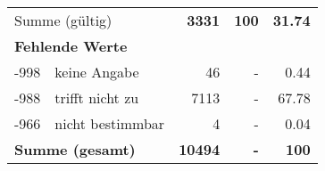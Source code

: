 \begin{longtable}{lXrrr}
     \midrule
     \multicolumn{2}{l}{Summe (gültig)} &
       \textbf{\num{3331}} &
     \textbf{\num{100}} &
       \textbf{\num[round-mode=places,round-precision=2]{31.74}} \\
     \multicolumn{5}{l}{\textbf{Fehlende Werte}}\\
       -998 &
       keine Angabe &
         \num{46} &
        - &
         \num[round-mode=places,round-precision=2]{0.44} \\
       -988 &
       trifft nicht zu &
         \num{7113} &
        - &
         \num[round-mode=places,round-precision=2]{67.78} \\
       -966 &
       nicht bestimmbar &
         \num{4} &
        - &
         \num[round-mode=places,round-precision=2]{0.04} \\
     \midrule
     \multicolumn{2}{l}{\textbf{Summe (gesamt)}} &
          \textbf{\num{10494}} &
        \textbf{-} &
        \textbf{\num{100}} \\
     \bottomrule
     \end{longtable}
     
